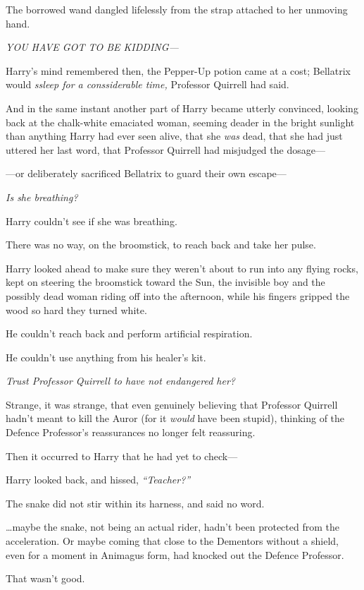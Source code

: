The borrowed wand dangled lifelessly from the strap attached to her
unmoving hand.

\emph{YOU HAVE GOT TO BE KIDDING---}

Harry's mind remembered then, the Pepper-Up potion came at a cost;
Bellatrix would \emph{ssleep for a conssiderable time,} Professor
Quirrell had said.

And in the same instant another part of Harry became utterly convinced,
looking back at the chalk-white emaciated woman, seeming deader in the
bright sunlight than anything Harry had ever seen alive, that she
\emph{was} dead, that she had just uttered her last word, that Professor
Quirrell had misjudged the dosage---

---or deliberately sacrificed Bellatrix to guard their own escape---

\emph{Is she breathing?}

Harry couldn't see if she was breathing.

There was no way, on the broomstick, to reach back and take her pulse.

Harry looked ahead to make sure they weren't about to run into any
flying rocks, kept on steering the broomstick toward the Sun, the
invisible boy and the possibly dead woman riding off into the afternoon,
while his fingers gripped the wood so hard they turned white.

He couldn't reach back and perform artificial respiration.

He couldn't use anything from his healer's kit.

\emph{Trust Professor Quirrell to have not endangered her?}

Strange, it was strange, that even genuinely believing that Professor
Quirrell hadn't meant to kill the Auror (for it \emph{would} have been
stupid), thinking of the Defence Professor's reassurances no longer felt
reassuring.

Then it occurred to Harry that he had yet to check---

Harry looked back, and hissed, \emph{``Teacher?''}

The snake did not stir within its harness, and said no word.

\ldots{}maybe the snake, not being an actual rider, hadn't been
protected from the acceleration. Or maybe coming that close to the
Dementors without a shield, even for a moment in Animagus form, had
knocked out the Defence Professor.

That wasn't good.

